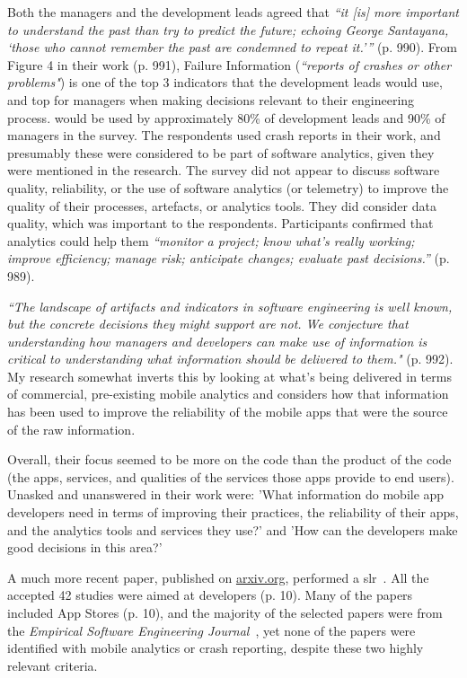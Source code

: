 Both the managers and the development leads agreed that \emph{``it [is] more important to understand the past than try to predict the future; echoing George Santayana, `those who cannot remember the past are condemned to repeat it.'''} (p. 990). From Figure 4 in their work (p. 991), Failure Information (\emph{``reports of crashes or other problems"}) is one of the top 3 indicators that the development leads would use, and top for managers when making decisions relevant to their engineering process.  would be used by approximately 80\% of development leads and 90\% of managers in the survey. The respondents used crash reports in their work, and presumably these were considered to be part of software analytics, given they were mentioned in the research. The survey did not appear to discuss software quality, reliability, or the use of software analytics (or telemetry) to improve the quality of their processes, artefacts, or analytics tools. They did consider data quality, which was important to the respondents.%
%
Participants confirmed that analytics could help them \emph{``monitor a project; know what's really working; improve efficiency; manage risk; anticipate changes; evaluate past decisions.''} (p. 989).

\emph{``The landscape of artifacts and indicators in software engineering is well known, but the concrete decisions they might support are not. We conjecture that understanding how managers and developers can make use of information is critical to understanding what information should be delivered to them."} (p. 992). 
My research somewhat inverts this by looking at what's being delivered in terms of commercial, pre-existing mobile analytics and considers how that information has been used to improve the reliability of the mobile apps that were the source of the raw information.

Overall, their focus seemed to be more on the code than the product of the code (the apps, services, and qualities of the services those apps provide to end users). Unasked and unanswered in their work were: 'What information do mobile app developers need in terms of improving their practices, the reliability of their apps, and the analytics tools and services they use?' and 'How can the developers make good decisions in this area?'

A much more recent paper, published on \href{https://arxiv.org/}{arxiv.org}, performed a \Gls{slr}~. All the accepted 42 studies were aimed at developers (p. 10). Many of the papers included App Stores (p. 10), and the majority of the selected papers were from the \emph{Empirical Software Engineering Journal}~, yet none of the papers were identified with mobile analytics or crash reporting, despite these two highly relevant criteria. 


